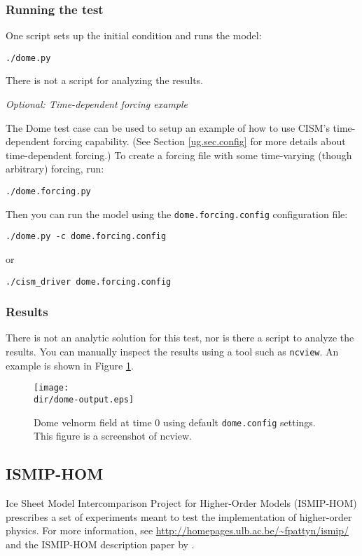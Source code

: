 \subsubsection{Running the test}
One script sets up the initial condition and runs the model:

\texttt{./dome.py}

There is not a script for analyzing the results.

\textit{Optional:  Time-dependent forcing example}

The Dome test case can be used to setup an example of how to use CISM's time-dependent
forcing capability.  (See Section \ref{ug.sec.config} for more details about time-dependent
forcing.)  To create a forcing file with some time-varying (though arbitrary) forcing, run:

\texttt{./dome.forcing.py}

Then you can run the model using the \texttt{dome.forcing.config} configuration file:

\texttt{./dome.py -c dome.forcing.config}

or

\texttt{./cism\_driver dome.forcing.config}


\subsubsection{Results}
There is not an analytic solution for this test, nor is there a script to analyze
the results.  You can manually inspect the results using a tool such as \texttt{ncview}.
An example is shown in Figure \ref{fig:domeresults}.

\begin{figure}[H!]
	\centering
	\texttt{[image: \\dir/dome-output.eps]}
	\caption{Dome velnorm field at time 0 using default \texttt{dome.config} settings. This figure is a screenshot of ncview.}
	\label{fig:domeresults}
\end{figure}
\FloatBarrier

\subsection{ISMIP-HOM}
Ice Sheet Model Intercomparison Project for Higher-Order Models (ISMIP-HOM)
prescribes a set of experiments meant to test the implementation of
higher-order physics.  For more information, see
\url{http://homepages.ulb.ac.be/~fpattyn/ismip/} and the ISMIP-HOM description paper
by \citet{Pattyn2008}.

